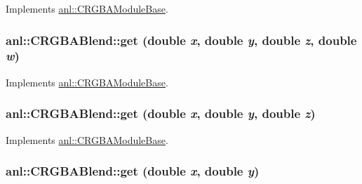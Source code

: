 Implements \hyperlink{classanl_1_1CRGBAModuleBase_aa5a0b719101302596a697aa8c2292f55}{anl::CRGBAModuleBase}.\hypertarget{classanl_1_1CRGBABlend_a6a44d17a9183cbff77d95203270d088a}{
\subsubsection[{get}]{ anl::CRGBABlend::get (double {\em x}, \/  double {\em y}, \/  double {\em z}, \/  double {\em w})}}
\label{classanl_1_1CRGBABlend_a6a44d17a9183cbff77d95203270d088a}


Implements \hyperlink{classanl_1_1CRGBAModuleBase_ab94523074ef298bb99f0830051e78c1c}{anl::CRGBAModuleBase}.\hypertarget{classanl_1_1CRGBABlend_ab7a8d72d44e559e98eb3945b90db5d52}{
\subsubsection[{get}]{ anl::CRGBABlend::get (double {\em x}, \/  double {\em y}, \/  double {\em z})}}
\label{classanl_1_1CRGBABlend_ab7a8d72d44e559e98eb3945b90db5d52}


Implements \hyperlink{classanl_1_1CRGBAModuleBase_a097897c2d625c824832325260169c90e}{anl::CRGBAModuleBase}.\hypertarget{classanl_1_1CRGBABlend_a3cc6fa4393c7cc41da66be7e460b609f}{
\subsubsection[{get}]{ anl::CRGBABlend::get (double {\em x}, \/  double {\em y})}}
\label{classanl_1_1CRGBABlend_a3cc6fa4393c7cc41da66be7e460b609f}


